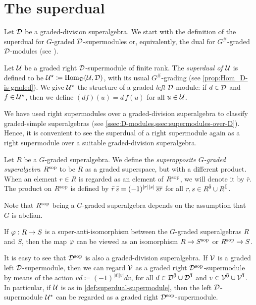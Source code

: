 \section{The superdual}\label{ssec:superdual}

Let $\mathcal{D}$ be a graded-division superalgebra. 
We start with the definition of the superdual for $G$-graded $\mathcal{D}$-supermodules or, equivalently, the dual for $G^\#$-graded $\mathcal{D}$-modules (see \cite[Definition 2.56]{livromicha}). 

\begin{defi}\label{def:superdual-supermodule}
    Let $\mathcal U$ be a graded right $\mathcal{D}$-supermodule of finite rank. 
    The \emph{superdual of $\mathcal U$} is defined to be $\mathcal U^\star \coloneqq \operatorname{Hom}_{\mathcal{D}} (\mathcal U,\mathcal{D})$, with its usual $G^\#$-grading (see \cref{prop:Hom_D-is-graded}). 
    We give $\mathcal U^\star$ the structure of a graded \emph{left} $\mathcal{D}$-module: if $d \in \mathcal{D}$ and $f \in \mathcal U ^\star$, then we define $(df)(u) = d\, f(u)$ for all $u\in \mathcal U$. 
\end{defi}

We have used right supermodules over a graded-division superalgebra to classify graded-simple superalgebras (see \cref{ssec:D-modules,ssec:supermodules-over-D}). 
Hence, it is convenient to see the superdual of a right supermodule again as a right supermodule over a suitable graded-division superalgebra.

\begin{defi}\label{def:superopposite}
    Let $R$ be a $G$-graded superalgebra. 
    We define the \emph{superopposite $G$-graded superalgebra $R^{\mathrm{sop}}$} to be $R$ as a graded superspace, but with a different product. 
    When an element $r\in R$ is regarded as an element of $R^{\mathrm{sop}}$, we will denote it by $\bar r$. 
    The product on $R^{\mathrm{sop}}$ is defined by $\bar r \, \bar {s} = (-1)^{|r||s|} \, \overline{sr}$ for all $r, s \in R^{\bar0} \cup R^{\bar1}$. 
\end{defi}

Note that $R^{\mathrm{sop}}$ being a $G$-graded superalgebra depends on the assumption that $G$ is abelian. 

\begin{remark}\label{rmk:sop-super-anti-iso}
    If $\varphi:R \to S$ is a super-anti-isomorphism between the $G$-graded superalgebras $R$ and $S$, then the map $\varphi$ can be viewed as an isomorphism $R\to S^{\mathrm{sop}}$ or $R^{\mathrm{sop}} \to S$.
\end{remark}

It is easy to see that $\mathcal{D}^{\mathrm{sop}}$ is also a graded-division superalgebra. 
If $\mathcal V$ is a graded left $\mathcal{D}$-supermodule, then we can regard $\mathcal V$ as a graded right $\mathcal{D}^{\mathrm{sop}}$-supermodule by means of the action $v \bar d \coloneqq (-1)^{|d||v|} dv$, for all $d\in \mathcal{D}^{\bar0} \cup \mathcal{D}^{\bar1}$ and $v\in \mathcal V^{\bar0} \cup \mathcal V^{\bar1}$. 
In particular, if $\mathcal U$ is as in \cref{def:superdual-supermodule}, then the left $\mathcal{D}$-supermodule $\mathcal U^\star$ can be regarded as a graded right $\mathcal{D}^{\mathrm{sop}}$-supermodule. 

